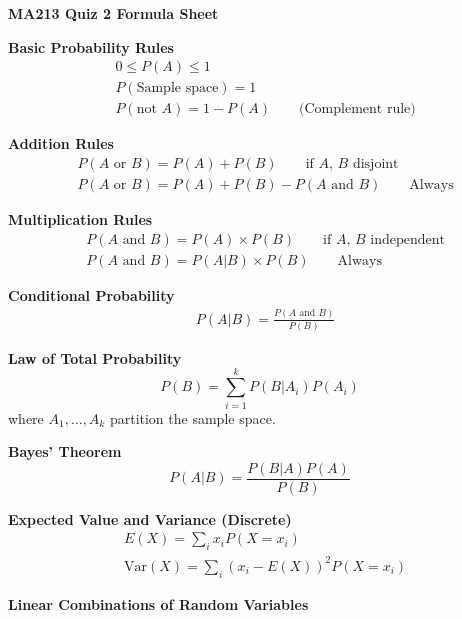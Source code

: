 \documentclass[8pt]{article}
\begin{document}
\begin{center}
    {\LARGE \textbf{MA213 Quiz 2 Formula Sheet}}
\end{center}

\vspace{1em}


\begin{multicols}{2} %

\textbf{Basic Probability Rules}
\begin{align*}
    &0 \leq P(A) \leq 1 \\
    &P(\text{Sample space}) = 1 \\
    &P(\text{not } A) = 1 - P(A) \qquad \text{(Complement rule)}
\end{align*}

\textbf{Addition Rules}
\begin{align*}
    &P(A \text{ or } B) = P(A) + P(B) \qquad \text{if $A$, $B$ disjoint} \\
    &P(A \text{ or } B) = P(A) + P(B) - P(A \text{ and } B) \qquad \text{Always}
\end{align*}

\textbf{Multiplication Rules}
\begin{align*}
    &P(A \text{ and } B) = P(A) \times P(B) \qquad \text{if $A$, $B$ independent} \\
    &P(A \text{ and } B) = P(A|B) \times P(B) \qquad \text{Always}
\end{align*}

\textbf{Conditional Probability}
\begin{align*}
    &P(A|B) = \frac{P(A \text{ and } B)}{P(B)} 
\end{align*}

\textbf{Law of Total Probability}
\[
P(B) = \sum_{i=1}^k P(B|A_i)P(A_i)
\]
where $A_1, \ldots, A_k$ partition the sample space.

\textbf{Bayes' Theorem}
\[
P(A|B) = \frac{P(B|A)P(A)}{P(B)}
\]

\textbf{Expected Value and Variance (Discrete)}
\begin{align*}
    &E(X) = \sum_{i} x_i P(X = x_i) \\
    &\mathrm{Var}(X) = \sum_{i} (x_i - E(X))^2 P(X = x_i)
\end{align*}

\textbf{Linear Combinations of Random Variables}


\end{multicols}
\end{document}
